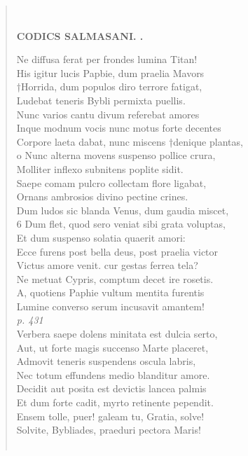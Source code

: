 \documentclass[11pt, a4paper]{report}
\begin{document}
\begin{verse}
        ﻿\pagebreak 
    \begin{center} \textbf{CODICS SALMASANI. .} \end{center} \marginpar{[205]} Ne diffusa ferat per frondes lumina Titan! \\ His igitur lucis Papbie, dum praelia Mavors \\ †Horrida, dum populos diro terrore fatigat, \\ Ludebat teneris Bybli permixta puellis. \\ Nunc varios cantu divum referebat amores \\ Inque modnum vocis nunc motus forte decentes \\ Corpore laeta dabat, nunc miscens †denique plantas, \\ o Nunc alterna movens suspenso pollice crura, \\ Molliter inflexo subnitens poplite sidit. \\ Saepe comam pulcro collectam flore ligabat, \\ Ornans ambrosios divino pectine crines. \\ Dum ludos sic blanda Venus, dum gaudia miscet, \\ 6 Dum flet, quod sero veniat sibi grata voluptas, \\ Et dum suspenso solatia quaerit amori: \\ Ecce furens post bella deus, post praelia victor \\ Victus amore venit. cur gestas ferrea tela? \\ Ne metuat Cypris, comptum decet ire rosetis. \\ A, quotiens Paphie vultum mentita furentis \\ Lumine converso serum incusavit amantem! \\ \textit{p. 431} \\ Verbera saepe dolens minitata est dulcia serto, \\ Aut, ut forte magis succenso Marte placeret, \\ Admovit teneris suspendens oscula labris, \\ Nec totum effundens medio blanditur amore. \\ Decidit aut posita est devictis lancea palmis \\ Et dum forte cadit, myrto retinente pependit. \\ Ensem tolle, puer! galeam tu, Gratia, solve! \\ Solvite, Bybliades, praeduri pectora Maris! \\ 
        ﻿\pagebreak 

\end{verse}
\end{document}
